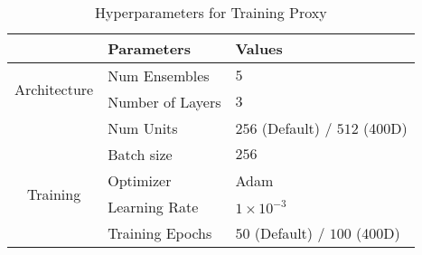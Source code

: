 
\begin{table*}[h]
\centering
\caption{Hyperparameters for Training Proxy}
\begin{tabular}{c|ll}
\toprule
& Parameters & Values \\
\midrule
\multirow{2}{*}{Architecture} & Num Ensembles & $5$ \\
                              & Number of Layers & $3$ \\
                              & Num Units & $256$ (Default) / $512$ (400D) \\
\midrule
\multirow{4}{*}{Training} & Batch size & $256$ \\
                          & Optimizer & Adam \\
                          & Learning Rate & $1 \times 10^{-3}$ \\
                          & Training Epochs & $50$ (Default) / $100$ (400D) \\
\bottomrule
\end{tabular}
\label{table:proxy hyperparams}
\end{table*}